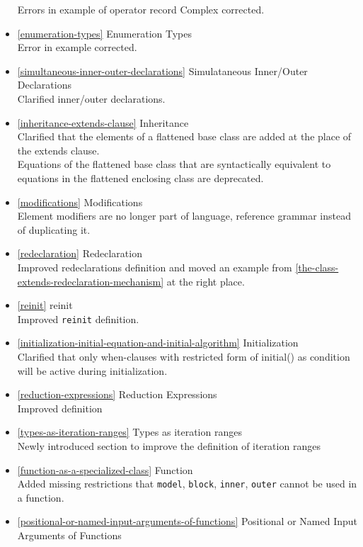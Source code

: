 \begin{itemize}
  Errors in example of operator record Complex corrected.
\item
  \cref{enumeration-types} Enumeration Types\\
  Error in example corrected.
\item
  \cref{simultaneous-inner-outer-declarations} Simulataneous Inner/Outer Declarations\\
  Clarified inner/outer declarations.
\item
  \cref{inheritance-extends-clause} Inheritance\\
  Clarified that the elements of a flattened base class are added at the
  place of the extends clause.\\
  Equations of the flattened base class that are syntactically
  equivalent to equations in the flattened enclosing class are
  deprecated.
\item
  \cref{modifications} Modifications\\
  Element modifiers are no longer part of language, reference grammar
  instead of duplicating it.
\item
  \cref{redeclaration} Redeclaration\\
  Improved redeclarations definition and moved an example from \cref{the-class-extends-redeclaration-mechanism} at
  the right place.
\item
  \cref{reinit} reinit\\
  Improved \lstinline!reinit! definition.
\item
  \cref{initialization-initial-equation-and-initial-algorithm} Initialization\\
  Clarified that only when-clauses with restricted form of initial() as
  condition will be active during initialization.
\item
  \cref{reduction-expressions} Reduction Expressions\\
  Improved definition
\item
  \cref{types-as-iteration-ranges} Types as iteration ranges\\
  Newly introduced section to improve the definition of iteration ranges
\item
  \cref{function-as-a-specialized-class} Function\\
  Added missing restrictions that \lstinline!model!, \lstinline!block!, \lstinline!inner!, \lstinline!outer! cannot be used in a function.
\item
  \cref{positional-or-named-input-arguments-of-functions} Positional or Named Input Arguments of Functions\\

\end{itemize}
